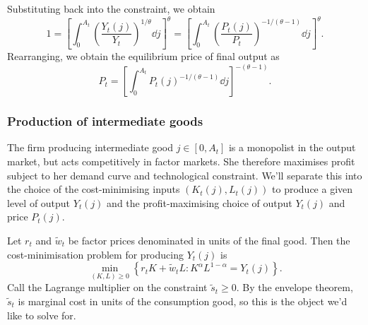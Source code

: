\documentclass[11pt,letterpaper,reqno,oneside]{article}
\begin{document}
Substituting back into the constraint, we obtain
%
\begin{equation*}
	1 = \left[ \int_0^{A_t} 
	\left(\frac{Y_t(j)}{Y_t}\right)^{1/\theta} 
	\dd j \right]^\theta 
	= \left[ \int_0^{A_t} 
	\left( \frac{ P_t(j) }{ P_t } \right)^{-1/(\theta-1)}
	\dd j \right]^\theta .
\end{equation*}
%
Rearranging, we obtain the equilibrium price of final output as
%
\begin{equation*}
	P_t
	= \left[ \int_0^{A_t} 
	P_t(j)^{-1/(\theta-1)} \dd j \right]^{-(\theta-1)} .
\end{equation*}



\subsubsection{Production of intermediate goods}
\label{sec:16Nov2015:coming_gertler_again:production_intermediate_goods}

The firm producing intermediate good $j \in [0,A_t]$ is a monopolist in the output market, but acts competitively in factor markets. She therefore maximises profit subject to her demand curve and technological constraint. We'll separate this into the choice of the cost-minimising inputs $(K_t(j),L_t(j))$ to produce a given level of output $Y_t(j)$ and the profit-maximising choice of output $Y_t(j)$ and price $P_t(j)$.

Let $r_t$ and $\widetilde{w}_t$ be factor prices denominated in units of the final good. Then the cost-minimisation problem for producing $Y_t(j)$ is
%
\begin{equation*}
	\min_{(K,L) \geq 0} \left\{
	r_t K + \widetilde{w}_t L :
	K^\alpha L^{1-\alpha} = Y_t(j) 
	\right\} .
\end{equation*}
%
Call the Lagrange multiplier on the constraint $\widetilde{s}_t \geq 0$. By the envelope theorem, $\widetilde{s}_t$ is marginal cost in units of the consumption good, so this is the object we'd like to solve for.
\end{document}
